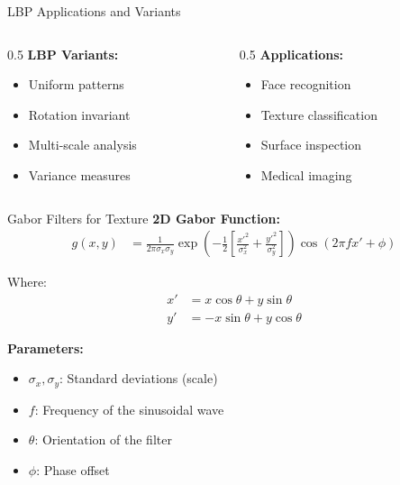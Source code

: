 \documentclass[aspectratio=169,10pt]{beamer}
\begin{document}
\begin{frame}{LBP Applications and Variants}
    \begin{columns}[c]
        \begin{column}{0.5\textwidth}
            \textbf{LBP Variants:}
            \begin{itemize}
                \item Uniform patterns
                \item Rotation invariant
                \item Multi-scale analysis
                \item Variance measures
            \end{itemize}
        \end{column}
        \begin{column}{0.5\textwidth}
            \textbf{Applications:}
            \begin{itemize}
                \item Face recognition
                \item Texture classification
                \item Surface inspection
                \item Medical imaging
            \end{itemize}
        \end{column}
    \end{columns}
\end{frame}

\begin{frame}{Gabor Filters for Texture}
    \textbf{2D Gabor Function:}
    \begin{align}
        g(x,y) &= \frac{1}{2\pi\sigma_x\sigma_y} \exp\left(-\frac{1}{2}\left[\frac{x'^2}{\sigma_x^2} + \frac{y'^2}{\sigma_y^2}\right]\right) \cos(2\pi fx' + \phi)
    \end{align}

    Where:
    \begin{align}
        x' &= x\cos\theta + y\sin\theta \\
        y' &= -x\sin\theta + y\cos\theta
    \end{align}

    \textbf{Parameters:}
    \begin{itemize}
        \item $\sigma_x, \sigma_y$: Standard deviations (scale)
        \item $f$: Frequency of the sinusoidal wave
        \item $\theta$: Orientation of the filter
        \item $\phi$: Phase offset
    \end{itemize}
\end{frame}
\end{document}
